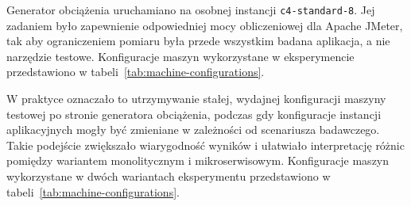 Generator obciążenia uruchamiano na osobnej instancji \texttt{c4-standard-8}. Jej zadaniem było zapewnienie odpowiedniej mocy obliczeniowej dla Apache JMeter, tak aby ograniczeniem pomiaru była przede wszystkim badana aplikacja, a nie narzędzie testowe. Konfiguracje maszyn wykorzystane w eksperymencie przedstawiono w tabeli~\ref{tab:machine-configurations}.

W praktyce oznaczało to utrzymywanie stałej, wydajnej konfiguracji maszyny testowej po stronie generatora obciążenia, podczas gdy konfiguracje instancji aplikacyjnych mogły być zmieniane w zależności od scenariusza badawczego. Takie podejście zwiększało wiarygodność wyników i ułatwiało interpretację różnic pomiędzy wariantem monolitycznym i mikroserwisowym. Konfiguracje maszyn wykorzystane w dwóch wariantach eksperymentu przedstawiono w tabeli~\ref{tab:machine-configurations}.

